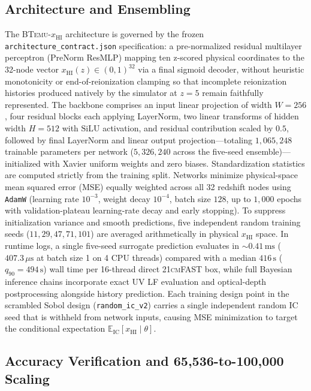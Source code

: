 \documentclass[aps,prd,reprint,superscriptaddress,nofootinbib,amsmath,amssymb,floatfix,longbibliography]{revtex4-2}
\begin{document}
\subsection{Architecture and Ensembling}\label{sec:xhi_arch}

The \textsc{BTemu}-$x_{\mathrm{HI}}$ architecture is governed by the frozen \texttt{architecture\_contract.json} specification: a pre-normalized residual multilayer perceptron (PreNorm ResMLP) mapping ten z-scored physical coordinates to the 32-node vector $x_{\mathrm{HI}}(z) \in (0, 1)^{32}$ via a final sigmoid decoder, without heuristic monotonicity or end-of-reionization clamping so that incomplete reionization histories produced natively by the simulator at $z=5$ remain faithfully represented. The backbone comprises an input linear projection of width $W=256$, four residual blocks each applying LayerNorm, two linear transforms of hidden width $H=512$ with $\mathrm{SiLU}$ activation, and residual contribution scaled by $0.5$, followed by final LayerNorm and linear output projection---totaling $1{,}065{,}248$ trainable parameters per network ($5{,}326{,}240$ across the five-seed ensemble)---initialized with Xavier uniform weights and zero biases. Standardization statistics are computed strictly from the training split. Networks minimize physical-space mean squared error (MSE) equally weighted across all 32 redshift nodes using \texttt{AdamW} (learning rate $10^{-3}$, weight decay $10^{-4}$, batch size $128$, up to $1{,}000$ epochs with validation-plateau learning-rate decay and early stopping). To suppress initialization variance and smooth predictions, five independent random training seeds ($11, 29, 47, 71, 101$) are averaged arithmetically in physical $x_{\mathrm{HI}}$ space. In runtime logs, a single five-seed surrogate prediction evaluates in $\sim 0.41\,\mathrm{ms}$ ($407.3\,\mu\mathrm{s}$ at batch size 1 on 4 CPU threads) compared with a median $416\,\mathrm{s}$ ($q_{90}=494\,\mathrm{s}$) wall time per 16-thread direct \textsc{21cmFAST} box, while full Bayesian inference chains incorporate exact UV LF evaluation and optical-depth postprocessing alongside history prediction. Each training design point in the scrambled Sobol design (\texttt{random\_ic\_v2}) carries a single independent random IC seed that is withheld from network inputs, causing MSE minimization to target the conditional expectation $\mathbb{E}_{\mathrm{IC}}[x_{\mathrm{HI}} \mid \theta]$.

\subsection{Accuracy Verification and 65,536-to-100,000 Scaling}\label{sec:xhi_acc}
\end{document}
